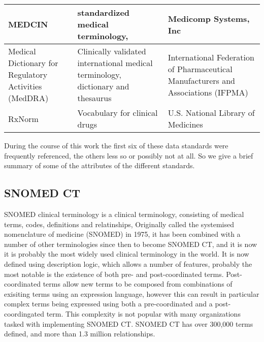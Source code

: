 \documentclass[runningheads]{llncs}
\begin{document}
\begin{table}[!htbp]
\begin{center}
\begin{tabular}{ p{3cm} | p{5cm} | p{4cm }  }
					\hline
				MEDCIN  &  standardized medical terminology, &  Medicomp Systems, Inc  \\
					\hline
				Medical Dictionary for Regulatory Activities (MedDRA) &  Clinically validated international medical terminology, dictionary and thesaurus  &   International Federation of Pharmaceutical Manufacturers and Associations (IFPMA) \\
				\hline
				RxNorm &  Vocabulary for clinical drugs &  U.S. National Library of Medicines  \\
			\end{tabular}
		\end{center}
	\end{table}
	
	

	
	During the course of this work the first six of these data standards were frequently referenced, the others less so or possibly not at all. So we give a brief summary of some of the attributes of the different standards.
	
	\subsection{SNOMED CT}
	SNOMED clinical terminology is a clinical terminology, consisting of medical terms, codes, definitions and relatinships,  Originally called the systemised nomenclature of medicine (SNOMED) in 1975, it has been combined with a number of other terminologies since then to become SNOMED CT, and it is now it is probably the most widely used clinical terminology in the world. It is now defined using description logic, which allows a number of features, probably the most notable is the existence of both pre- and post-coordinated terms. Post-coordinated terms allow new terms to be composed from combinations of exisiting terms using an expression language, however this can result in particular complex terms being expressed using both a pre-coordinated and a post-coordingated term. This complexity is not popular with many organizations tasked with implementing SNOMED CT. SNOMED CT has over 300,000 terms defined, and more than 1.3 million relationships.
	
\end{document}
